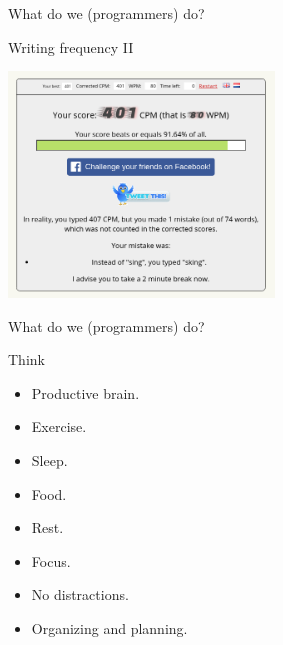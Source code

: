 \begin{frame}{What do we (programmers) do?}
  \begin{block}{Writing frequency II}
    \begin{center}
      \includegraphics[height=6cm]{img/my-typing-02.png}
    \end{center}
  \end{block}
\end{frame}

\begin{frame}{What do we (programmers) do?}
  \begin{block}{Think}
    \begin{itemize}
      \item Productive brain. 
      \item Exercise. %
      \item Sleep. %
      \item Food. %
      \item Rest. %
      \item Focus. %
      \item No distractions. %
      \item Organizing and planning. %
    \end{itemize}
  \end{block}
\end{frame}

